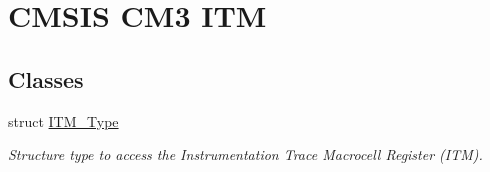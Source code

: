 \hypertarget{group___c_m_s_i_s___c_m3___i_t_m}{\section{C\-M\-S\-I\-S C\-M3 I\-T\-M}
\label{group___c_m_s_i_s___c_m3___i_t_m}
}
\subsection*{Classes}
\begin{DoxyCompactItemize}
\item 
struct \hyperlink{struct_i_t_m___type}{I\-T\-M\-\_\-\-Type}
\begin{DoxyCompactList}\small\item\em Structure type to access the Instrumentation Trace Macrocell Register (I\-T\-M). \end{DoxyCompactList}\end{DoxyCompactItemize}
